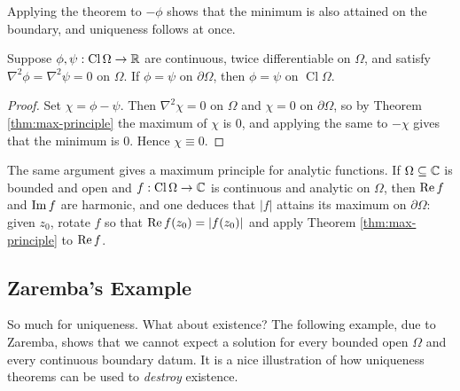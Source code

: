 \documentclass[a4paper]{scrartcl}
\newcommand{\Cl}{\operatorname{Cl}}
\begin{document}
Applying the theorem to $-\phi$ shows that the minimum is also attained on the boundary, and uniqueness follows at once.

\begin{theorem}\label{thm:dirichlet-unique}
	Suppose $\phi,\psi : \Cl\Omega \to \R$ are continuous, twice differentiable on $\Omega$, and satisfy $\nabla^2\phi = \nabla^2\psi = 0$ on $\Omega$. If $\phi = \psi$ on $\partial\Omega$, then $\phi = \psi$ on $\Cl\Omega$.
\end{theorem}

\begin{proof}
	Set $\chi = \phi-\psi$. Then $\nabla^2 \chi = 0$ on $\Omega$ and $\chi = 0$ on $\partial\Omega$, so by Theorem \ref{thm:max-principle} the maximum of $\chi$ is $0$, and applying the same to $-\chi$ gives that the minimum is $0$. Hence $\chi \equiv 0$.
\end{proof}

\begin{remark}
	The same argument gives a maximum principle for analytic functions. If $\Omega \subseteq \mathbb{C}$ is bounded and open and $f : \Cl\Omega \to \C$ is continuous and analytic on $\Omega$, then $\operatorname{Re} f$ and $\operatorname{Im} f$ are harmonic, and one deduces that $|f|$ attains its maximum on $\partial\Omega$: given $z_0$, rotate $f$ so that $\operatorname{Re} f(z_0) = |f(z_0)|$ and apply Theorem \ref{thm:max-principle} to $\operatorname{Re} f$.
\end{remark}

\subsection{Zaremba's Example}

So much for uniqueness. What about existence? The following example, due to Zaremba, shows that we cannot expect a solution for every bounded open $\Omega$ and every continuous boundary datum. It is a nice illustration of how uniqueness theorems can be used to \emph{destroy} existence.
\end{document}

